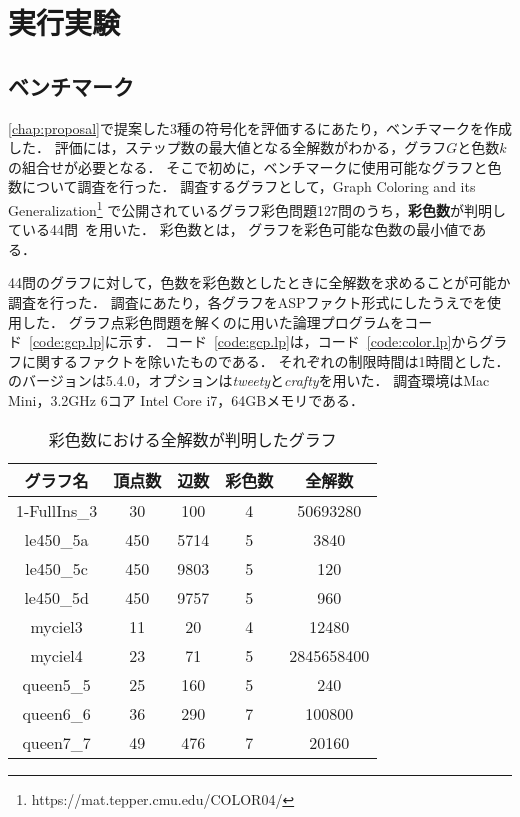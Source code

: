 \chapter{実行実験} \label{chap:experiment}

\section{ベンチマーク}
\ref{chap:proposal}で提案した3種の符号化を評価するにあたり，ベンチマークを作成した．
評価には，ステップ数の最大値となる全解数がわかる，グラフ$G$と色数$k$の組合せが必要となる．
そこで初めに，ベンチマークに使用可能なグラフと色数について調査を行った．
調査するグラフとして，Graph Coloring and its Generalization\footnote{https://mat.tepper.cmu.edu/COLOR04/}
で公開されているグラフ彩色問題127問のうち，\textbf{彩色数}が判明している44問~\cite{DBLP:journals/constraints/TamuraTKB09}を用いた．
彩色数とは， グラフを彩色可能な色数の最小値である．

44問のグラフに対して，色数を彩色数としたときに全解数を求めることが可能か調査を行った．
調査にあたり，各グラフをASPファクト形式にしたうえで{\clingo}を使用した．
グラフ点彩色問題を解くのに用いた論理プログラムをコード~\ref{code:gcp.lp}に示す．
コード~\ref{code:gcp.lp}は，コード~\ref{code:color.lp}からグラフに関するファクトを除いたものである．
それぞれの制限時間は1時間とした．
{\clingo}のバージョンは5.4.0，オプションは\textsl{tweety}と\textsl{crafty}を用いた．
調査環境はMac Mini，3.2GHz 6コア Intel Core i7，64GBメモリである．



\begin{table}[tb]
  \centering
  \caption{彩色数における全解数が判明したグラフ}
  \begin{tabular}{|c|c|c|c|c|} \hline
    グラフ名 & 頂点数 & 辺数 & 彩色数 & 全解数 \\ \hline
    1-FullIns\_3 & 30 & 100 & 4 & 50693280 \\ \hline
    le450\_5a & 450 & 5714 & 5 & 3840 \\ \hline
    le450\_5c & 450 & 9803 & 5 & 120 \\ \hline
    le450\_5d & 450 & 9757 & 5 & 960 \\ \hline
    myciel3 & 11 & 20 & 4 & 12480 \\ \hline
    myciel4 & 23 & 71 & 5 & 2845658400 \\ \hline
    queen5\_5 & 25 & 160 & 5 & 240 \\ \hline 
    queen6\_6 & 36 & 290 & 7 & 100800 \\ \hline
    queen7\_7 & 49 & 476 & 7 & 20160 \\ \hline
  \end{tabular}
  \label{tab:bench_graph}
\end{table}

